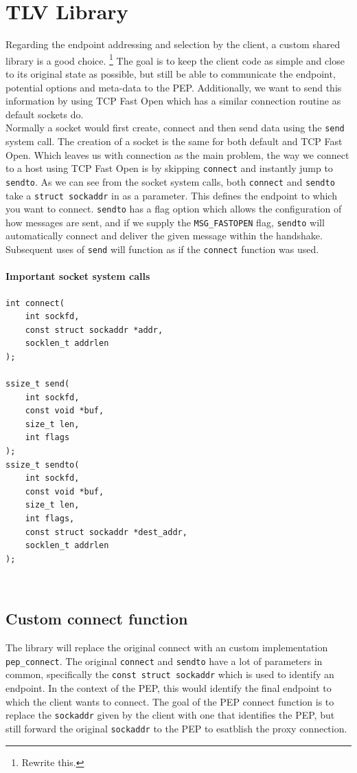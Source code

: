 \documentclass[a4paper,english, 11pt]{report}
\begin{document}
\section{TLV Library}
Regarding the endpoint addressing and selection by the client, a custom shared library is a good choice.
\footnote{Rewrite this.} The goal is to keep the client code as simple and close to its original state as possible, but still be able to communicate the endpoint, potential options and meta-data to the PEP. Additionally, we want to send this information by using TCP Fast Open which has a similar connection routine as default sockets do.\\

Normally a socket would first create, connect and then send data using the \verb|send| system call. The creation of a socket is the same for both default and TCP Fast Open. Which leaves us with connection as the main problem, the way we connect to a host using TCP Fast Open is by skipping \verb|connect| and instantly jump to \verb|sendto|. As we can see from the socket system calls, both \verb|connect| and \verb|sendto| take a \verb|struct sockaddr| in as a parameter. This defines the endpoint to which you want to connect. \verb|sendto| has a flag option which allows the configuration of how messages are sent, and if we supply the \verb|MSG_FASTOPEN| flag, \verb|sendto| will automatically connect and deliver the given message within the handshake. Subsequent uses of \verb|send| will function as if the \verb|connect| function was used.\\

\noindent\begin{minipage}{\linewidth}
\paragraph{Important socket system calls}
\begin{verbatim}
int connect(
    int sockfd,
    const struct sockaddr *addr,
    socklen_t addrlen
);

ssize_t send(
    int sockfd,
    const void *buf,
    size_t len,
    int flags
);
ssize_t sendto(
    int sockfd,
    const void *buf,
    size_t len,
    int flags,
    const struct sockaddr *dest_addr,
    socklen_t addrlen
);
\end{verbatim}
\end{minipage}\\


\subsection{Custom connect function}
The library will replace the original connect with an custom implementation \verb|pep_connect|. The original \verb|connect| and \verb|sendto| have a lot of parameters in common, specifically the \verb|const struct sockaddr| which is used to identify an endpoint. In the context of the PEP, this would identify the final endpoint to which the client wants to connect. The goal of the PEP connect function is to replace the \verb|sockaddr| given by the client with one that identifies the PEP, but still forward the original \verb|sockaddr| to the PEP to esatblish the proxy connection.\\
\end{document}
